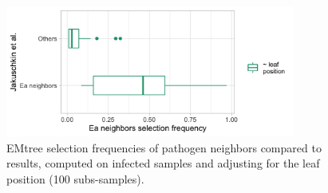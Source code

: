 \begin{figure}[H]
    \centering
    \includegraphics[width=9.5cm]{figs/EAneighbors.png}
    \caption{EMtree selection frequencies of pathogen neighbors compared to \citet{jakuch} results, computed on infected samples and adjusting for the leaf position (100 subs-samples). }
    \label{otujak}
\end{figure}

 
